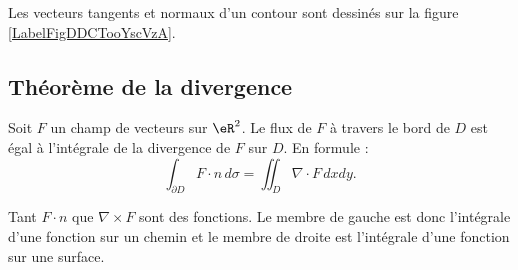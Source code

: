 Les vecteurs tangents et normaux d'un contour sont dessinés sur la figure \ref{LabelFigDDCTooYscVzA}.

\newcommand{\CaptionFigDDCTooYscVzA}{Le champ de vecteurs tangents est dessiné en rouge tandis qu'en vert nous avons le champ de vecteurs normaux extérieurs.}


\subsection{Théorème de la divergence}

\begin{theorem}
    Soit $F$ un champ de vecteurs sur $\eR^2$. Le flux de $F$ à travers le bord de $D$ est égal à l'intégrale de la divergence de $F$ sur $D$. En formule :
    \begin{equation}
        \int_{\partial D} F\cdot n\,d\sigma=\iint_D\nabla\cdot F\,dxdy.
    \end{equation}
\end{theorem}

\begin{remark}
    Tant $F\cdot n$ que $\nabla\times F$ sont des fonctions. Le membre de gauche est donc l'intégrale d'une fonction sur un chemin et le membre de droite est l'intégrale d'une fonction sur une surface.
\end{remark}

